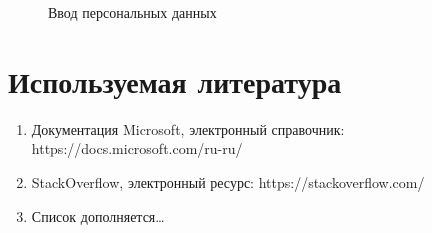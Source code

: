 \documentclass{../includes/TechDoc}
\begin{document}
\begin{enumerate}
\begin{figure}[h]
\begin{center}
\begin{minipage}[h]{0.4\linewidth}
                    \caption{Ввод персональных данных}
                    \label{ris:experimcoded}
                \end{minipage}
            \end{center}
        \end{figure}
    \end{enumerate}


    \section{Используемая литература}

    \begin{enumerate}
        \item Документация Microsoft, электронный справочник: https://docs.microsoft.com/ru-ru/
        \item StackOverflow, электронный ресурс: https://stackoverflow.com/
        \item Список дополняется\ldots
    \end{enumerate}


    \registrationList
\end{document}
